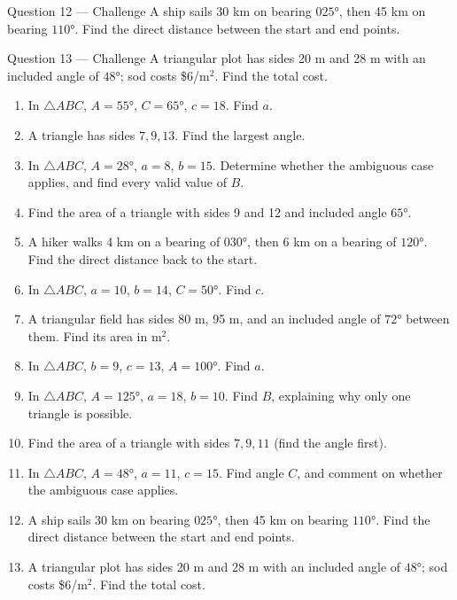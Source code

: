 \documentclass[11pt]{article}
\begin{document}
\begin{qbox}{Question 12 --- Challenge}
A ship sails 30 km on bearing $025°$, then 45 km on bearing $110°$. Find the direct distance between the start and end points.\workspace{3.2cm}
\end{qbox}

\begin{qbox}{Question 13 --- Challenge}
A triangular plot has sides 20 m and 28 m with an included angle of $48°$; sod costs \$6/m$^2$. Find the total cost.\workspace{3.2cm}
\end{qbox}

\clearpage
{}

\begin{recapbox}
\begin{multicols}{2}
\small
\begin{enumerate}[leftmargin=*,itemsep=3pt]
  \item In $\triangle ABC$, $A=55°$, $C=65°$, $c=18$. Find $a$.
  \item A triangle has sides $7,9,13$. Find the largest angle.
  \item In $\triangle ABC$, $A=28°$, $a=8$, $b=15$. Determine whether the ambiguous case applies, and find every valid value of $B$.
  \item Find the area of a triangle with sides 9 and 12 and included angle $65°$.
  \item A hiker walks 4 km on a bearing of $030°$, then 6 km on a bearing of $120°$. Find the direct distance back to the start.
  \item In $\triangle ABC$, $a=10$, $b=14$, $C=50°$. Find $c$.
  \item A triangular field has sides 80 m, 95 m, and an included angle of $72°$ between them. Find its area in m$^2$.
  \item In $\triangle ABC$, $b=9$, $c=13$, $A=100°$. Find $a$.
  \item In $\triangle ABC$, $A=125°$, $a=18$, $b=10$. Find $B$, explaining why only one triangle is possible.
  \item Find the area of a triangle with sides $7,9,11$ (find the angle first).
  \item In $\triangle ABC$, $A=48°$, $a=11$, $c=15$. Find angle $C$, and comment on whether the ambiguous case applies.
  \item A ship sails 30 km on bearing $025°$, then 45 km on bearing $110°$. Find the direct distance between the start and end points.
  \item A triangular plot has sides 20 m and 28 m with an included angle of $48°$; sod costs \$6/m$^2$. Find the total cost.
\end{enumerate}
\end{multicols}
\end{recapbox}
\end{document}

